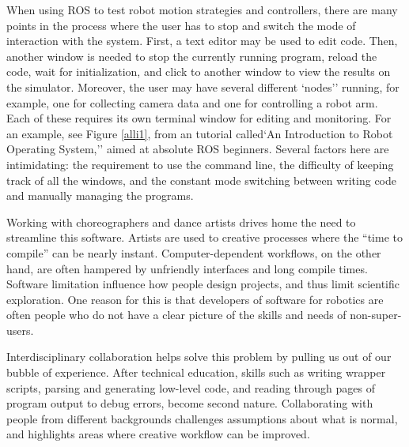 \documentclass[arts,article,submit,moreauthors,pdftex,10pt,a4paper]{mdpi}
\begin{document}
When using ROS to test robot motion strategies and controllers, there are many
points in the process where the user has to stop and switch the mode of
interaction with the system. First, a text editor may be used to edit code.
Then, another window is needed to stop the currently running program, reload the
code, wait for initialization, and click to another window to view the results
on the simulator. Moreover, the user may have several different
`nodes'' running, for example, one for collecting camera data and one for controlling a robot arm. Each of these requires its own terminal window for editing and monitoring. For an example, see Figure \ref{alli1}, from an tutorial called`An
Introduction to Robot Operating System,'' aimed at absolute ROS beginners.
Several factors here are intimidating: the requirement to use the command line,
the difficulty of keeping track of all the windows, and the constant mode
switching between writing code and manually managing the programs.

Working with choreographers and dance artists drives home the need to streamline
this software. Artists are used to creative processes where the ``time to compile'' can be nearly
instant. Computer-dependent workflows, on the other hand, are often hampered by
unfriendly interfaces and long compile times.
Software limitation influence how people design projects, and
thus limit scientific exploration. One reason for this is that developers of software for robotics are often
people who do not have a clear picture of the skills and needs of
non-super-users. 

Interdisciplinary collaboration helps solve this problem by pulling us out of our bubble of
experience. After technical education, skills such as writing wrapper
scripts, parsing and generating low-level code, and reading through pages of
program output to debug errors, become second nature. Collaborating with people
from different backgrounds challenges assumptions about what is normal, and
highlights areas where creative workflow can be improved.
\end{document}
